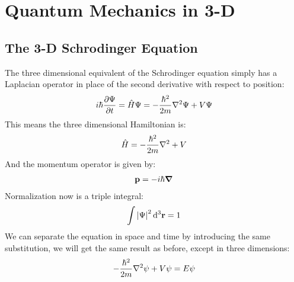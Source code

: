 \section{Quantum Mechanics in 3-D}
\subsection{The 3-D Schrodinger Equation}
The three dimensional equivalent of the Schrodinger equation simply has a Laplacian operator in place of the second derivative with respect to position:
\begin{align*}
  i\hbar\pdv{\Psi}{t}=\hat{H}\Psi=-\dfrac{\hbar^2}{2m}\laplacian{\Psi}+V\Psi
\end{align*}
This means the three dimensional Hamiltonian is:
\begin{align*}
  \hat{H}=-\dfrac{\hbar^2}{2m}\laplacian{}+V
\end{align*}
And the momentum operator is given by:
\begin{align*}
  \vb{p}=-i\hbar\grad
\end{align*}
Normalization now is a triple integral:
\begin{align*}
  \int\abs{\Psi}^2\dd[3]{\vb{r}}=1
\end{align*}
We can separate the equation in space and time by introducing the same substitution, we will get the same result as before, except in three dimensions:
\begin{align*}
  -\dfrac{\hbar^2}{2m}\laplacian{\psi}+V\psi=E\psi
\end{align*}
